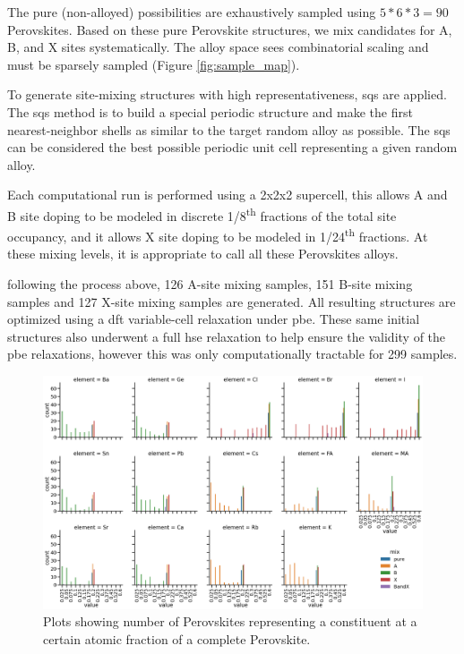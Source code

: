 \documentclass[twoside, twocolumn, 9pt, draft]{article}
\begin{document}
The pure (non-alloyed) possibilities are exhaustively sampled using
\(5*6*3 = 90\) Perovskites. Based on these pure Perovskite structures,
we mix candidates for A, B, and X sites systematically. The alloy
space sees combinatorial scaling and must be sparsely sampled (Figure
\ref{fig:sample_map}).

To generate site-mixing structures with high representativeness,
\acrfull{sqs}\cite{RN3} are applied. The \acrshort{sqs} method is
to build a special periodic structure and make the first
nearest-neighbor shells as similar to the target random alloy as
possible. The \acrshort{sqs} can be considered the best possible periodic unit
cell representing a given random alloy.

Each computational run is performed using a 2x2x2 supercell, this
allows A and B site doping to be modeled in discrete 1/8\textsuperscript{th} fractions
of the total site occupancy, and it allows X site doping to be modeled
in 1/24\textsuperscript{th} fractions. At these mixing levels, it is appropriate to
call all these Perovskites alloys.

following the process above, 126 A-site mixing samples, 151 B-site
mixing samples and 127 X-site mixing samples are generated. All
resulting structures are optimized using a \acrshort{dft} variable-cell
relaxation under \acrfull{pbe}. These same initial structures also underwent a
full \acrfull{hse} relaxation to help ensure the validity of the \acrshort{pbe}
relaxations, however this was only computationally tractable for 299
samples.

\begin{figure}
\centering
\includegraphics[width=.9\linewidth]{./domains/variability_of_composition_vectors.png}
\caption{\label{fig:chemspace_uni} Plots showing number of Perovskites representing a constituent at a certain atomic fraction of a complete Perovskite.}
\end{figure}
\end{document}
